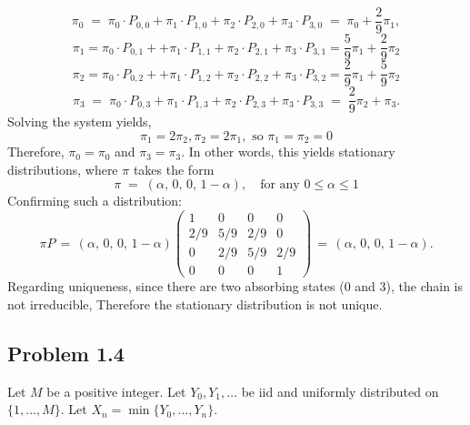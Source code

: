 \documentclass{article}
\begin{document}
\begin{enumerate}
{\[
\pi_0 
\;=\;
\pi_0 \cdot P_{0,0} + \pi_1 \cdot P_{1,0} + \pi_2 \cdot P_{2,0} + \pi_3 \cdot P_{3,0}
\;=\;
\pi_0 + \frac{2}{9}\pi_1,
\]
$$\pi_1 = \pi_0 \cdot P_{0,1} + + \pi_1 \cdot P_{1,1} + \pi_2 \cdot P_{2,1} + \pi_3 \cdot P_{3,1}
=\frac{5}{9}\pi_1 + \frac{2}{9}\pi_2$$
$$\pi_2 = \pi_0 \cdot P_{0,2} + + \pi_1 \cdot P_{1,2} + \pi_2 \cdot P_{2,2} + \pi_3 \cdot P_{3,2}=
\frac{2}{9}\pi_1 + \frac{5}{9}\pi_2$$
\[
\pi_3 
\;=\;
\pi_0 \cdot P_{0,3} + \pi_1 \cdot P_{1,3} + \pi_2 \cdot P_{2,3} + \pi_3 \cdot P_{3,3}
\;=\;
\frac{2}{9}\pi_2 + \pi_3.
\]
Solving the system yields, 
$$\pi_1=2\pi_2, \pi_2=2\pi_1, \text{ so } \pi_1=\pi_2=0$$ Therefore, $\pi_0=\pi_0$ and $\pi_3=\pi_3$. In other words, this yields stationary distributions, where $\pi$ takes the form
\[
\pi \;=\; (\alpha,\, 0,\, 0,\, 1-\alpha),
\quad
\text{for any } 0 \le \alpha \le 1
\]
Confirming such a distribution:
\[
\pi P 
\,=\,
(\alpha,\, 0,\, 0,\, 1-\alpha)
\begin{pmatrix}
1 & 0 & 0 & 0\\
2/9 & 5/9 & 2/9 & 0\\
0 & 2/9 & 5/9 & 2/9\\
0 & 0 & 0 & 1
\end{pmatrix}
\,=\,
(\alpha,\, 0,\, 0,\, 1-\alpha).
\]
Regarding uniqueness, since there are two absorbing states ($0$ and $3$), the chain is not irreducible, Therefore the stationary distribution is not unique. 
}
\end{enumerate}

\subsection*{Problem 1.4}
Let $M$ be a positive integer. Let $Y_0, Y_1, \ldots$ be iid and uniformly distributed on $\{1, \ldots, M\}$. Let $X_n = \min\{Y_0, \ldots, Y_n\}$.
\end{document}
